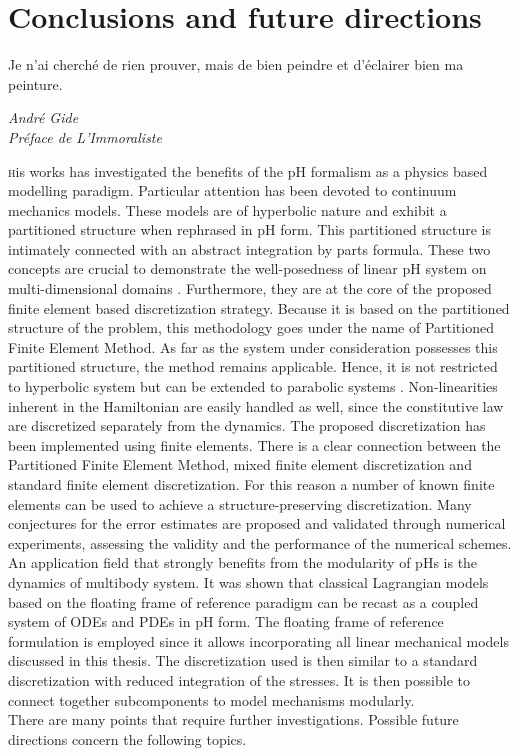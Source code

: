\chapter*{Conclusions and future directions}

\epigraph{Je n’ai cherché de rien prouver, mais de bien peindre et d’éclairer bien ma peinture.}{\textit{André Gide \\ Préface de L'Immoraliste}}

\lettrine{\color{theme}{T}}his works has investigated the benefits of the pH formalism as a physics based modelling paradigm. Particular attention has been devoted to continuum mechanics models. These models are of hyperbolic nature and exhibit a partitioned structure when rephrased in  pH form. This partitioned structure is intimately connected with an abstract integration by parts formula. These two concepts are crucial to demonstrate the well-posedness of linear pH system on multi-dimensional domains \cite{skrepek2019wellposedness}. Furthermore, they are at the core of the proposed finite element based discretization strategy. Because it is based on the partitioned structure of the problem, this methodology goes under the name of Partitioned Finite Element Method. As far as the system under consideration possesses this partitioned structure, the method remains applicable. Hence, it is not restricted to  hyperbolic system but can be extended to parabolic systems \cite{serhani2019discretization}. Non-linearities inherent in the Hamiltonian are easily handled as well, since the constitutive law are discretized separately from the dynamics. The proposed discretization has been implemented using finite elements. There is a clear connection between the Partitioned Finite Element Method, mixed finite element discretization and standard finite element discretization. For this reason a number of known finite elements can be used to achieve a structure-preserving discretization. Many conjectures for the error estimates are proposed and validated through numerical experiments, assessing the validity and the performance of the numerical schemes. An application field that strongly benefits from the modularity of pHs is the dynamics of multibody system. It was shown that classical Lagrangian models based on the floating frame of reference paradigm can be recast as a coupled system of ODEs and PDEs in pH form. The floating frame of reference formulation is employed since it allows incorporating all linear mechanical models discussed in this thesis. The discretization used is then similar to a standard discretization with reduced integration of the stresses. It is then possible to connect together subcomponents to model mechanisms modularly. \\ There are many points that require further investigations. Possible future directions concern the following topics.


